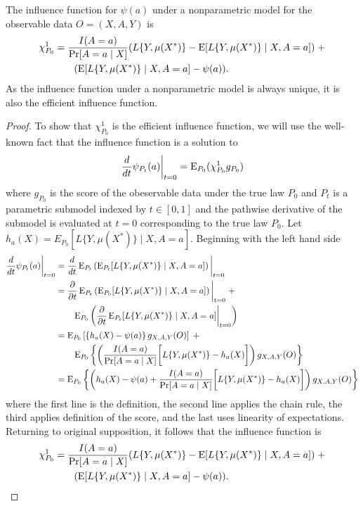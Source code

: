 \begin{theorem}
    The influence function for $\psi(a)$ under a nonparametric model for the observable data $O = (X, A, Y)$ is 
\begin{align*}
    \chi_{P_0}^1 &= \frac{I(A = a)}{\Pr[A = a \mid X]}(L\{Y, \mu(X^*)\} - \operatorname{E}[L\{Y, \mu(X^*)\} \mid X, A=a])  \; + \\
    & \qquad (\operatorname{E}[L\{Y, \mu(X^*)\} \mid X, A=a] - \psi(a)).
\end{align*}
As the influence function under a nonparametric model is always unique, it is also the efficient influence function. 
\end{theorem}


\begin{proof}
To show that $\chi_{P_0}^1$ is the efficient influence function, we will use the well-known fact that the influence function is a solution to 
\begin{equation*}
    \frac{d}{dt} \psi_{P_t}(a)\bigg\vert_{t=0} = \operatorname{E}_{P_0}(\chi_{P_0}^1g_{P_0})
\end{equation*}
where $g_{P_0}$ is the score of the obeservable data under the true law $P_0$ and $P_t$ is a parametric submodel indexed by $t \in [0,1]$ and the pathwise derivative of the submodel is evaluated at $t = 0$ corresponding to the true law $P_0$. Let $h_a(X) = E_{P_0}[L\{Y, \mu(X^*)\} \mid X, A=a]$. Beginning with the left hand side
\begin{align*}
    \frac{d}{dt} \psi_{P_t}(a)\bigg\vert_{t=0} &=\frac{d}{dt} \operatorname{E}_{P_t}\left(\operatorname{E}_{P_t}[L\{Y, \mu(X^*)\} \mid X, A=a] \right)\bigg\vert_{t=0} \\
    &=\frac{\partial}{\partial t} \operatorname{E}_{P_t}\left(\operatorname{E}_{P_0}[L\{Y, \mu(X^*)\} \mid X, A=a] \right)\bigg\vert_{t=0} \;+ \\
    &\qquad  \operatorname{E}_{P_0}\left(\frac{\partial}{\partial t} \operatorname{E}_{P_t}[L\{Y, \mu(X^*)\} \mid X, A=a] \bigg\vert_{t=0} \right) \\
    &=\operatorname{E}_{P_0}\left[\left\{h_a(X) - \psi(a) \right\}g_{X, A, Y}(O)\right] \;+ \\
    &\qquad  \operatorname{E}_{P_0}\left\{\left( \frac{I(A = a)}{\Pr[A = a \mid X]} \bigg[L\{Y, \mu(X^*)\} - h_a(X) \bigg]\right)g_{X, A, Y}(O)\right\} \\
    &= \operatorname{E}_{P_0}\left\{\left(h_a(X) - \psi(a) + \frac{I(A = a)}{\Pr[A = a \mid X]} \bigg[L\{Y, \mu(X^*)\} - h_a(X) \bigg]\right)g_{X, A, Y}(O)\right\} 
\end{align*}
where the first line is the definition, the second line applies the chain rule, the third applies definition of the score, and the last uses linearity of expectations. Returning to original supposition, it follows that the influence function is 
\begin{align*}
    \chi_{P_0}^1 &= \frac{I(A = a)}{\Pr[A = a \mid X]}(L\{Y, \mu(X^*)\} - \operatorname{E}[L\{Y, \mu(X^*)\} \mid X, A=a])  \; + \\
    & \qquad (\operatorname{E}[L\{Y, \mu(X^*)\} \mid X, A=a] - \psi(a)).
\end{align*}
\end{proof}

